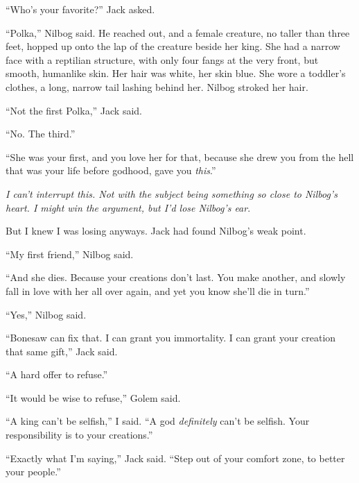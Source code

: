 ``Who's your favorite?'' Jack asked.



``Polka,'' Nilbog said.  He reached out, and a female creature, no taller than three feet, hopped up onto the lap of the creature beside her king.  She had a narrow face with a reptilian structure, with only four fangs at the very front, but smooth, humanlike skin.  Her hair was white, her skin blue.  She wore a toddler's clothes, a long, narrow tail lashing behind her.  Nilbog stroked her hair.



``Not the first Polka,'' Jack said.



``No.  The third.''



``She was your first, and you love her for that, because she drew you from the hell that was your life before godhood, gave you \emph{this}.''



\emph{I can't interrupt this.  Not with the subject being something so close to Nilbog's heart.  I might win the argument, but I'd lose Nilbog's ear}.



But I knew I was losing anyways.  Jack had found Nilbog's weak point.



``My first friend,'' Nilbog said.



``And she dies.  Because your creations don't last.  You make another, and slowly fall in love with her all over again, and yet you know she'll die in turn.''



``Yes,'' Nilbog said.



``Bonesaw can fix that.  I can grant you immortality.  I can grant your creation that same gift,'' Jack said.



``A hard offer to refuse.''



``It would be wise to refuse,'' Golem said.



``A king can't be selfish,'' I said.  ``A god \emph{definitely} can't be selfish.  Your responsibility is to your creations.''



``Exactly what I'm saying,'' Jack said.  ``Step out of your comfort zone, to better your people.''




